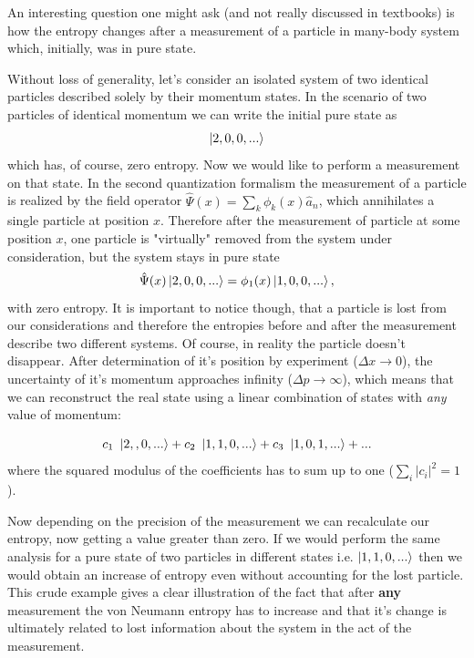 \documentclass[a4paper,12pt]{article}
\begin{document}
An interesting question one might ask (and not really discussed in textbooks) is how the entropy changes after a measurement of a particle in many-body system which, initially, was in pure state.

Without loss of generality, let's consider an isolated system of two identical particles described solely by their momentum states.
In the scenario of two particles of identical momentum we can write the initial pure state as 
\begin{equation}
  \ket{2,0,0,...}
\end{equation}
which has, of course, zero entropy. Now we would like to perform a measurement on that state. 
In the second quantization formalism the measurement of a particle is realized by the field operator $ \hat{\Psi}(x) =\sum_k \phi_k(x)\hat{a}_n$, which annihilates a single particle at position $x$.
Therefore after the measurement of particle at some position $x$, one particle is "virtually" removed from the system under consideration, but the system stays in pure state
\begin{equation}
  \hat{\Psi}(x)\ket{2,0,0,...}=\phi_1(x)\ket{1,0,0,...},
\end{equation}
with zero entropy. It is important to notice though, that a particle is lost from our considerations and therefore the entropies before and after the measurement describe two different systems. Of course, in reality the particle doesn't disappear. After determination of it's position by experiment ($\Delta x \to 0$), the uncertainty of it's momentum approaches infinity ($\Delta p \to \infty$), which means that we can reconstruct the real state using a linear combination of states with \textit{any} value of momentum:

\begin{equation}
  c_1\ \ket{2,,0,...}+c_2\ \ket{1,1,0,...}+  c_3\ \ket{1,0,1,...}+...
\end{equation}
where the  squared modulus of the coefficients has to sum up to one ($ \sum_i \left| c_i \right|^2 = 1 $).

Now depending on the precision of the measurement we can recalculate our entropy, now getting a value greater than zero. If we would perform the same analysis for a pure state of two particles in different states i.e. $\ket{1,1,0,...}$ then we would obtain an increase of entropy even without accounting for the lost particle.
This crude example gives a clear illustration of the fact that after \textbf{any} measurement the von Neumann entropy has to increase and that it's change is ultimately related to lost information about the system in the act of the measurement.
\end{document}
